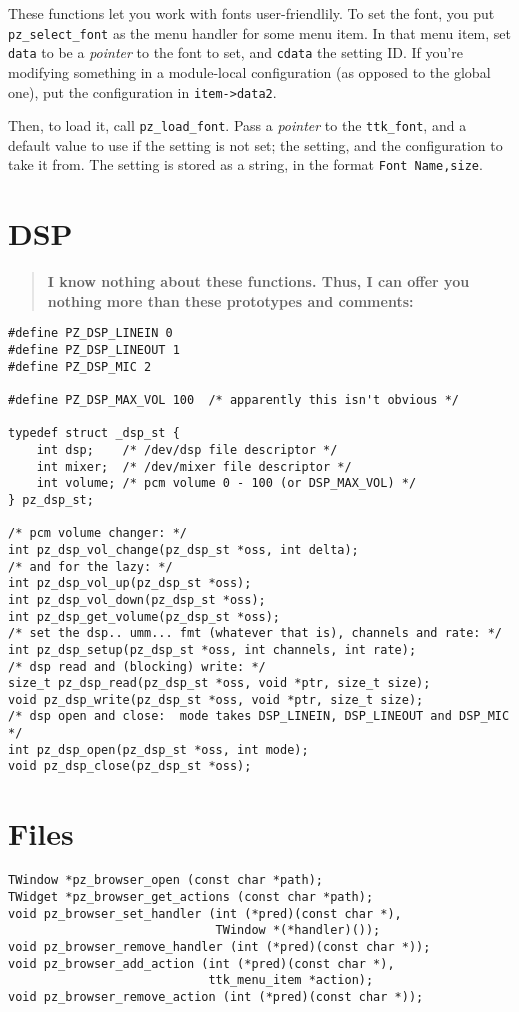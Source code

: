 \documentclass[12pt,letterpaper]{report}
\begin{document}
These functions let you work with fonts user-friendlily.
To set the font, you put \verb|pz_select_font| as the menu handler
for some menu item. In that menu item, set \verb|data| to be a
{\it pointer} to the font to set, and \verb|cdata| the setting ID.
If you're modifying something in a module-local configuration (as
opposed to the global one), put the configuration in \verb|item->data2|.

Then, to load it, call \verb|pz_load_font|. Pass a {\it pointer}
to the \verb|ttk_font|, and a default value to use if the setting is not set;
the setting, and the configuration to take it from. The setting is stored
as a string, in the format \verb|Font Name,size|.

\section{DSP}
\begin{quote}\large\bf I know nothing about these functions. Thus, I can offer you nothing
more than these prototypes and comments:\end{quote}
\begin{verbatim}
#define PZ_DSP_LINEIN 0
#define PZ_DSP_LINEOUT 1
#define PZ_DSP_MIC 2

#define PZ_DSP_MAX_VOL 100	/* apparently this isn't obvious */

typedef struct _dsp_st {
	int dsp;	/* /dev/dsp file descriptor */
	int mixer;	/* /dev/mixer file descriptor */
	int volume;	/* pcm volume 0 - 100 (or DSP_MAX_VOL) */
} pz_dsp_st;

/* pcm volume changer: */
int pz_dsp_vol_change(pz_dsp_st *oss, int delta);
/* and for the lazy: */
int pz_dsp_vol_up(pz_dsp_st *oss);
int pz_dsp_vol_down(pz_dsp_st *oss);
int pz_dsp_get_volume(pz_dsp_st *oss);
/* set the dsp.. umm... fmt (whatever that is), channels and rate: */
int pz_dsp_setup(pz_dsp_st *oss, int channels, int rate);
/* dsp read and (blocking) write: */
size_t pz_dsp_read(pz_dsp_st *oss, void *ptr, size_t size);
void pz_dsp_write(pz_dsp_st *oss, void *ptr, size_t size);
/* dsp open and close:  mode takes DSP_LINEIN, DSP_LINEOUT and DSP_MIC */
int pz_dsp_open(pz_dsp_st *oss, int mode);
void pz_dsp_close(pz_dsp_st *oss);
\end{verbatim}

\section{Files}
\begin{verbatim}
TWindow *pz_browser_open (const char *path);
TWidget *pz_browser_get_actions (const char *path);
void pz_browser_set_handler (int (*pred)(const char *),
                             TWindow *(*handler)());
void pz_browser_remove_handler (int (*pred)(const char *));
void pz_browser_add_action (int (*pred)(const char *),
                            ttk_menu_item *action);
void pz_browser_remove_action (int (*pred)(const char *));
\end{verbatim}
\end{document}
